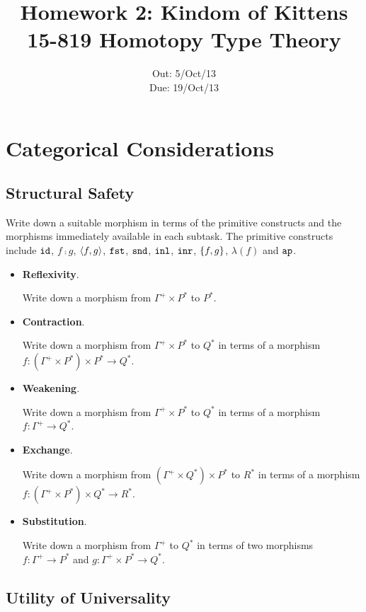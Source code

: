\documentclass[12pt]{article}
\title{\Large\textbf{
  Homework 2: Kindom of Kittens}
\normalsize\\
15-819 Homotopy Type Theory}
\author{}
\date{%
Out: 5/Oct/13\\
Due: 19/Oct/13
}
\begin{document}
\maketitle

\section{Categorical Considerations}

\subsection{Structural Safety}

\begin{task}\label{task:struct}
  Write down a suitable morphism in terms of the primitive constructs
  and the morphisms immediately available in each subtask.
  The primitive constructs include
  $\mathtt{id}$, $f \comp g$, $\langle f,g\rangle$, $\mathtt{fst}$, $\mathtt{snd}$, $\mathtt{inl}$, $\mathtt{inr}$, $\{ f,g\}$, $\lambda(f)$ and $\mathtt{ap}$.
  \begin{itemize}
    \item
      \textbf{Reflexivity}.

      Write down a morphism from $\Gamma^+ \times P^*$ to $P^*$.
    \item
      \textbf{Contraction}.

      Write down a morphism from $\Gamma^+ \times P^*$ to $Q^*$
      in terms of a morphism
      $f : (\Gamma^+ \times P^*) \times P^* \to Q^*$.
    \item
      \textbf{Weakening}.

      Write down a morphism from $\Gamma^+ \times P^*$ to $Q^*$
      in terms of a morphism
      $f : \Gamma^+ \to Q^*$.
    \item
      \textbf{Exchange}.

      Write down a morphism from
      $(\Gamma^+ \times Q^*) \times P^*$ to $R^*$
      in terms of a morphism
      $f : (\Gamma^+ \times P^*) \times Q^* \to R^*$.
    \item
      \textbf{Substitution}.

      Write down a morphism from $\Gamma^+$ to $Q^*$ in terms of
      two morphisms
      $f : \Gamma^+ \to P^*$
      and
      $g : \Gamma^+ \times P^* \to Q^*$.
  \end{itemize}
\end{task}

\subsection{Utility of Universality}
\end{document}
